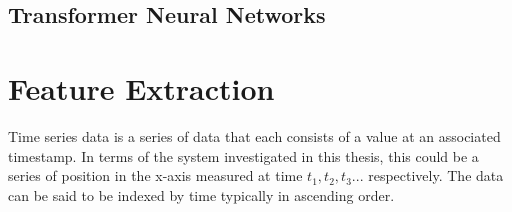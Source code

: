 \subsection{Transformer Neural Networks}

\section{Feature Extraction}
Time series data is a series of data that each consists of a value at an associated timestamp. In terms of the system investigated in this thesis, this could be a series of position in the x-axis measured at time $t_1, t_2, t_3...$ respectively. The data can be said to be indexed by time \cite{yinPredictionAnalysisTime2023} typically in ascending order.

